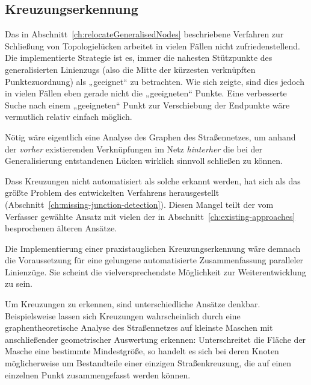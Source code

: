 \documentclass[../main/thesis.tex]{subfiles}
\begin{document}
\subsection{Kreuzungserkennung}
\label{ch:improvements-junction-detection}

Das in Abschnitt~\ref{ch:relocateGeneralisedNodes} beschriebene Verfahren zur Schließung von Topologielücken arbeitet in vielen Fällen nicht zufriedenstellend.
Die implementierte Strategie ist es, immer die nahesten Stützpunkte des generalisierten Linienzugs (also die Mitte der kürzesten verknüpften Punktezuordnung) als „geeignet“ zu betrachten.
Wie sich zeigte, sind dies jedoch in vielen Fällen eben gerade nicht die „geeigneten“ Punkte.
Eine verbesserte Suche nach einem „geeigneten“ Punkt zur Verschiebung der Endpunkte wäre vermutlich relativ einfach möglich.

Nötig wäre eigentlich eine Analyse des Graphen des Straßennetzes, um anhand der \emph{vorher} existierenden Verknüpfungen im Netz \emph{hinterher} die bei der Generalisierung entstandenen Lücken wirklich sinnvoll schließen zu können.


Dass Kreuzungen nicht automatisiert als solche erkannt werden, hat sich als das größte Problem des entwickelten Verfahrens herausgestellt (Abschnitt~\ref{ch:missing-junction-detection}).
Diesen Mangel teilt der vom Verfasser gewählte Ansatz mit vielen der in Abschnitt~\ref{ch:existing-approaches} besprochenen älteren Ansätze.

Die Implementierung einer praxistauglichen Kreuzungserkennung wäre demnach die Voraussetzung für eine gelungene automatisierte Zusammenfassung paralleler Linienzüge.
Sie scheint die vielversprechendste Möglichkeit zur Weiterentwicklung zu sein.

Um Kreuzungen zu erkennen, sind unterschiedliche Ansätze denkbar.
Beispielsweise lassen sich Kreuzungen wahrscheinlich durch eine graphentheoretische Analyse des Straßennetzes auf kleinste Maschen mit anschließender geometrischer Auswertung erkennen:
Unterschreitet die Fläche der Masche eine bestimmte Mindestgröße, so handelt es sich bei deren Knoten möglicherweise um Bestandteile einer einzigen Straßenkreuzung, die auf einen einzelnen Punkt zusammengefasst werden können.
\end{document}
